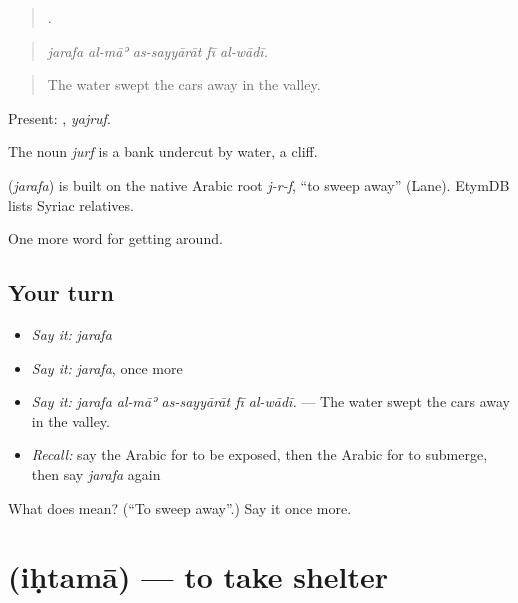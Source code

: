 \begin{quote}
    .
\end{quote}

\begin{quote}
\emph{jarafa al-māʾ as-sayyārāt fī al-wādī.}
\end{quote}

\begin{quote}
The water swept the cars away in the valley.
\end{quote}

Present: , \emph{yajruf}.

The noun \emph{jurf} is a bank undercut by water, a cliff.

\begin{cousinweb}
\textbf{} (\emph{jarafa}) is built on the native Arabic root \emph{j-r-f}, \textquotedblleft{}to sweep away\textquotedblright{} (Lane). EtymDB lists Syriac relatives.
\end{cousinweb}

\begin{grammarlens}[title={What you've built}]
One more word for getting around.
\end{grammarlens}

\subsection*{Your turn}
\begin{itemize}
\raggedright
  \item \emph{Say it:} \emph{jarafa}
  \item \emph{Say it:} \emph{jarafa}, once more
  \item \emph{Say it:} \emph{jarafa al-māʾ as-sayyārāt fī al-wādī.} — The water swept the cars away in the valley.
  \item \emph{Recall:} say the Arabic for to be exposed, then the Arabic for to submerge, then say \emph{jarafa} again
\end{itemize}

\begin{tcolorbox}[breakable,colback=teal!4,colframe=teal!35!black,title={Before you move on}]
What does  mean? (\textquotedblleft{}To sweep away\textquotedblright{}.) Say it once more.
\end{tcolorbox}
\section[\texorpdfstring{\ar{احتمى} (iḥtamā)}{احتمى (iḥtamā)}]{ (iḥtamā) — to take shelter}

